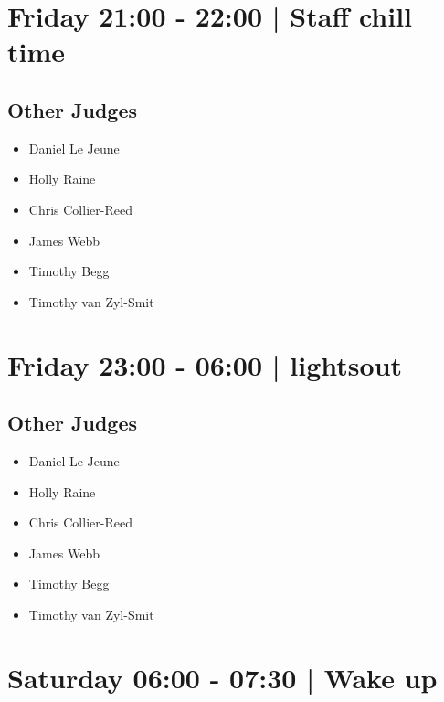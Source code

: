 \documentclass[10pt]{article}
\begin{document}
            \section*{Friday 21:00
        -
        22:00
        |
         Staff chill time}
        
                
        \subsection*{Other Judges}
        
            \begin{itemize}
                            \item Daniel Le Jeune
                            \item Holly Raine
                            \item Chris Collier-Reed
                            \item James Webb
                            \item Timothy Begg
                            \item Timothy van Zyl-Smit
                        \end{itemize}
        

            \section*{Friday 23:00
        -
        06:00
        |
         lightsout}
        
                
        \subsection*{Other Judges}
        
            \begin{itemize}
                            \item Daniel Le Jeune
                            \item Holly Raine
                            \item Chris Collier-Reed
                            \item James Webb
                            \item Timothy Begg
                            \item Timothy van Zyl-Smit
                        \end{itemize}
        

            \section*{Saturday 06:00
        -
        07:30
        |
         Wake up}
        
\end{document}
